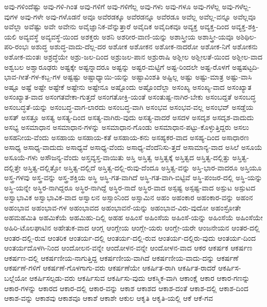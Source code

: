 {ಅವು-ಗಳಿಂದೆಷ್ಟು
ಅವು-ಗಳಿ-ಗಿಂತ
ಅವು-ಗಳಿಗೆ
ಅವು-ಗಳಿಗೆಲ್ಲ
ಅವು-ಗಳು
ಅವು-ಗಳೂ
ಅವು-ಗಳೆಲ್ಲ
ಅವು-ಗಳೆಲ್ಲ-ವುಗಳ
ಅವು-ಗಳೇ
ಅವು-ಗಳೊಡನೆ
ಅವೂ
ಅವೆರಡಕ್ಕೂ
ಅವೆರಡನ್ನೂ
ಅವೆರಡೂ
ಅವೆಲ್ಲ
ಅವೆಲ್ಲ-ವನ್ನೂ
ಅವೆಲ್ಲವೂ
ಅವೆಲ್ಲಾ
ಅವೆಷ್ಟು
ಅವೇ
ಅವೇನು
ಅವೈಜ್ಞಾನಿಕ-ವೆನ್ನುತ್ತಾರೆ
ಅವೈದಿಕ
ಅವೈದಿಕವೂ
ಅವ್ಯಕ್ತ
ಅವ್ಯಕ್ತ-ದಿಂದ
ಅವ್ಯಕ್ತ-ಶಕ್ತಿ-ಯಲಿ
ಅವ್ಯವಸ್ಥೆ
ಅವ್ಯವಸ್ಥೆ-ಯಿಂದ
ಅಶಕ್ತರು
ಅಶನಿ
ಅಶರೀರ-ವಾಣಿ-ಯನ್ನು
ಅಶಾಸ್ತ್ರೀಯ
ಅಶಾಸ್ತ್ರೀ-ಯವೂ
ಅಶಿಥಿಲ-ಪರಿ-ರಂಭಃ
ಅಶುದ್ಧ
ಅಶುದ್ಧ-ವಾದು-ದೆಲ್ಲ-ದರ
ಅಶೋಕ
ಅಶೋಕನ
ಅಶೋಕ-ನಾದರೋ
ಅಶೋಕ-ನಿಗೆ
ಅಶೋಕನು
ಅಶೋಕ-ಮಂತಃ
ಅಶ್ರದ್ಧೆಯೇ
ಅಶ್ರು-ಜಲ-ದಿಂದ
ಅಶ್ರುಜಲ-ಪಾನ
ಅಶ್ರುರಾಷಿ
ಅಶ್ಲೀಲ
ಅಶ್ಲೀಲತೆ-ಯಿಂದ
ಅಶ್ಲೀಲ-ವಾದ
ಅಶ್ವಬಲ
ಅಶ್ವಾರೂಢರು
ಅಷ್ಟಕ್ಕೇ
ಅಷ್ಟನ್ನಾದರೂ
ಅಷ್ಟನ್ನು
ಅಷ್ಟರ-ಮಟ್ಟಿಗೆ
ಅಷ್ಟ-ರಿಂದಲೇ
ಅಷ್ಟ-ರೊಳಗೆ
ಅಷ್ಟಷಟ್ಟದಿ-ಭಾವ-ಗೀತೆ-ಗಳ-ಕಬ್ಬ-ಗಳ
ಅಷ್ಟಷ್ಟು
ಅಷ್ಟಾಧ್ಯಾಯಿ-ಯನ್ನು
ಅಷ್ಟಾವಿಂಶತಿ
ಅಷ್ಟಿಲ್ಲ
ಅಷ್ಟು
ಅಷ್ಟು-ಮಾತ್ರ
ಅಷ್ಟು-ವಾಸಿ
ಅಷ್ಟೂ
ಅಷ್ಟೆ
ಅಷ್ಟೇ
ಅಷ್ಟೇಕೆ
ಅಷ್ಟೇನು
ಅಷ್ಟೇನೂ
ಅಷ್ಟೊಂದು
ಅಷ್ಟೊಂದೆಲ್ಲಾ
ಅಸಂಖ್ಯ
ಅಸಂಖ್ಯ-ವಾದ
ಅಸಂಖ್ಯಾತ
ಅಸಂಖ್ಯಾತ-ವಾದ
ಅಸಂಗತವೇಕಾ-ಗುತ್ತದೆ
ಅಸಂಗತೋಕ್ತಿ-ಯಂತೆ
ಅಸಂತುಷ್ಟ-ನಾಗಿರ-ಬೇಕು
ಅಸಂಬದ್ದತೆ
ಅಸಂಬದ್ಧ
ಅಸಂಬದ್ಧತೆ-ಯನ್ನು
ಅಸಂಬದ್ಧ-ವಾಗ-ಲಾರದು
ಅಸಂಬದ್ಧ-ವಾಗಿ
ಅಸಂಭವ
ಅಸಂಭವ-ವಲ್ಲ
ಅಸಂಭವ್
ಅಸಡ್ಡೆಯ
ಅಸತ್
ಅಸತ್ತೂ
ಅಸತ್ಯ
ಅಸತ್ಯ-ದಿಂದ
ಅಸತ್ಯ-ವಾಗಿರು-ವುದು
ಅಸತ್ಯ-ವಾದರೆ
ಅಸದಳ
ಅಸದೃಶ
ಅಸದೃಶ-ವಾದುದು
ಅಸಭ್ಯ
ಅಸಮಾಧಾನ
ಅಸಮಾಧಾನ-ಗಳನ್ನು
ಅಸಮಾಧಾನ-ಗೊಂಡು
ಅಸಮಾಧಾನ-ಪಟ್ಟು-ಕೊಳ್ಳುತ್ತಿದ್ದರು
ಅಸಲು
ಅಸಹನೀಯ-ವೆಂದು
ಅಸಹಾಯ
ಅಸಹಾಯ-ಕತೆ
ಅಸಹಾಯ-ಕನು
ಅಸಹ್ಯಕರ-ವಾದ
ಅಸಹ್ಯ-ದಿಂದ
ಅಸಾಧಾರಣ
ಅಸಾಧ್ಯ
ಅಸಾಧ್ಯ-ವಾದುದು
ಅಸಾಧ್ಯವೆ
ಅಸಾಧ್ಯ-ವೆಂದು
ಅಸಾಧ್ಯ-ವೆಂದೆನಿಸು-ತ್ತದೆ
ಅಸಾಮಾನ್ಯ-ವಾದ
ಅಸಿಲೆ
ಅಸೂಯೆ
ಅಸೂಯೆ-ಗಳು
ಅಸೌಜನ್ಯ-ವೆಂದು
ಅಸ್ತವ್ಯಸ್ತ-ವಾಯಿತು
ಅಸ್ತಿ
ಅಸ್ತಿತ್ವ
ಅಸ್ತಿತ್ವಕ್ಕೆ
ಅಸ್ತಿತ್ವದ
ಅಸ್ತಿತ್ವ-ದಲ್ಲಿತ್ತು
ಅಸ್ತಿತ್ವ-ದಲ್ಲಿತ್ತೇ
ಅಸ್ತಿತ್ವ-ದಲ್ಲಿತ್ತೋ
ಅಸ್ತಿತ್ವ-ದಲ್ಲಿದೆ
ಅಸ್ತಿತ್ವ-ದಲ್ಲಿ-ರುವು-ದೆಂದೂ
ಅಸ್ತಿತ್ವ-ವನ್ನು
ಅಸ್ತಿ-ಭಾರ-ವಾದರೂ
ಅಸ್ತಿಯೂ
ಅಸ್ತ್ರ-ಗಳವು
ಅಸ್ತ್ರ-ವನ್ನು
ಅಸ್ತ್ರ-ಶಕ್ತಿಯ
ಅಸ್ಥಿ
ಅಸ್ಥಿ-ಗತ-ವಾಗಿದೆ
ಅಸ್ಥಿ-ಗತ-ವಾಗಿ-ಬಿಟ್ಟಿವೆ
ಅಸ್ಥಿ-ಪಂಜರ-ದಲ್ಲಿ
ಅಸ್ಥಿ-ಯನ್ನು
ಅಸ್ಥಿ-ಯನ್ನೇ
ಅಸ್ಥಿರ-ನಾಗಿದ್ದರೂ
ಅಸ್ಥಿರ-ನಾಗಿದ್ದೆ
ಅಸ್ಥಿರ-ನಾದೆ
ಅಸ್ಥಿರ-ವಾದ
ಅಸ್ಪಷ್ಟ
ಅಸ್ಪಷ್ಟ-ವಾದ
ಅಸ್ಪುಟ
ಅಸ್ಪುಟದ
ಅಸ್ವಾಭಾವಿಕ
ಅಸ್ವಾಭಾವಿಕ-ವಾದ
ಅಸ್ವಾಲನ
ಅಸ್ಸಾಂನಿಂದ
ಅಸ್ಸಾಮಿನ
ಅಹಂ
ಅಹಂಕಾರ
ಅಹಂಕಾರ-ವನ್ನು
ಅಹಂನ
ಅಹಂಭಾವ
ಅಹಂಭಾವ-ಗಳ
ಅಹಂಭಾವದ
ಅಹಂಭಾವನೆ-ಯನ್ನು
ಅಹಂಭಾವ-ವಿರು-ವುದೋ
ಅಹಂಸ್ರೋತೇ
ಅಹಮಹಮಿತಿ
ಅಹಮಿಕೆಯೆ
ಅಹಮಿಹು-ದಿಲ್ಲಿ
ಅಹಹ
ಅಹಿಂಸೆ
ಅಹಿಂಸೆಯ
ಅಹಿಂಸೆ-ಯನ್ನು
ಅಹಿಂಸೆಯೆ
ಅಹಿಂಸೆಯೇ
ಅಹಿರಿ-ಟೊಲಘಾಟಿನ
ಅಹೇತುಕ-ವಾದ
ಆಂಗ್ಲ
ಆಂಗ್ಲೇಯ
ಆಂಗ್ಲೇ-ಯರು
ಆಂಗ್ಲೇ-ಯರೇ
ಆಂಜನೇಯನ
ಆಂತರ-ದಲ್ಲಿ
ಆಂತರ-ದಲ್ಲಿ-ರುವ
ಆಂತರಿಕ
ಆಂತರ್ಯ-ದಲ್ಲಿ
ಆಂತರ್ಯ-ದಲ್ಲಿ-ರುವ
ಆಂತರ್ಯ-ದಲ್ಲಿರು-ವುದು
ಆಂತರ್ಯ-ದಿಂದ
ಆಂತರ್ಯದೊಳಗಿ-ನಿಂದ
ಆಂದೋಲನ-ವನ್ನೇ
ಆಂದೋಳನ-ವನ್ನೇ
ಆಂದೋಳನ-ವಾದ
ಆಕರ
ಆಕರ್ಷಕ
ಆಕರ್ಷಣ
ಆಕರ್ಷಣ-ದಲ್ಲಿ
ಆಕರ್ಷಣೀಯ-ನಾಗುತ್ತಿದ್ದ
ಆಕರ್ಷಣೀಯ-ವಾಗಿದೆ
ಆಕರ್ಷಣೀಯ-ವಾದು-ದನ್ನು
ಆಕರ್ಷಣೆ
ಆಕರ್ಷಣೆ-ಗಳಿಗೆ
ಆಕರ್ಷಣೆ-ಗೊಳಗಾಗು-ವರು
ಆಕರ್ಷಣೆಯೇ
ಆಕರ್ಷಿತ-ರಾಗಿ
ಆಕರ್ಷಿತ-ರಾದರೆ
ಆಕರ್ಷಿಸ-ಬಲ್ಲೆಯೋ
ಆಕರ್ಷಿಸಲ್ಪಡು-ವರು
ಆಕರ್ಷಿಸುವ
ಆಕರ್ಷಿಸು-ವುದು
ಆಕಸ್ಮಿಕ-ವಾಗಿ
ಆಕಾಂಕ್ಷೆ
ಆಕಾರ
ಆಕಾರ-ಗಣನ್ನು
ಆಕಾರ-ಗಳನ್ನು
ಆಕಾರದ
ಆಕಾರ-ದಲ್ಲಿ
ಆಕಾರ-ವನ್ನು
ಆಕಾಶ
ಆಕಾಶದ
ಆಕಾಶ-ದಂತೆ
ಆಕಾಶ-ದಲ್ಲಿ
ಆಕಾಶ-ದಿಂದ
ಆಕಾಶ-ವನ್ನು
ಆಕಾಶವು
ಆಕಾಶವೂ
ಆಕಾಶೆ
ಆಕಾಶೇ
ಆಕುಲ
ಆಕೃತಿ
ಆಕೃತಿ-ಯಲ್ಲಿ
ಆಕೆ
ಆಕೆ-ಗವ
}
